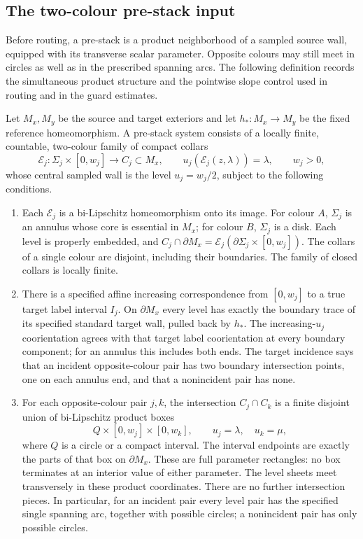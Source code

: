 \subsection{The two-colour pre-stack input}
\label{wl:prestack-subsection}

Before routing, a pre-stack is a product neighborhood of a sampled source
wall, equipped with its transverse scalar parameter.  Opposite colours may
still meet in circles as well as in the prescribed spanning arcs.  The
following definition records the simultaneous product structure and the
pointwise slope control used in routing and in the guard estimates.

\begin{definition}\label{wl:prestack}
Let $M_x,M_y$ be the source and target exteriors and let
$h_*:M_x\to M_y$ be the fixed reference homeomorphism.  A pre-stack
system consists of a locally finite, countable, two-colour family of
compact collars
\[
 \mathcal E_j:\Sigma_j\times[0,w_j]\longrightarrow C_j\subset M_x,
 \qquad u_j(\mathcal E_j(z,\lambda))=\lambda,\qquad w_j>0,
\]
whose central sampled wall is the level $u_j=w_j/2$, subject to the
following conditions.
\begin{enumerate}
\item Each $\mathcal E_j$ is a bi-Lipschitz homeomorphism onto its image.
For colour $A$, $\Sigma_j$ is an annulus whose core is essential in
$M_x$; for colour $B$, $\Sigma_j$ is a disk.
Each level is properly embedded, and
$C_j\cap\partial M_x=\mathcal E_j(\partial\Sigma_j\times[0,w_j])$.
The collars of a single colour are disjoint, including their boundaries.
The family of closed collars is locally finite.

\item There is a specified affine increasing correspondence from
$[0,w_j]$ to a true target label interval $I_j$.
On $\partial M_x$ every level has exactly the boundary trace of its
specified standard target wall, pulled back by $h_*$.
The increasing-$u_j$ coorientation agrees with that target label
coorientation at every boundary component; for an annulus this includes
both ends.  The target incidence says that an incident opposite-colour
pair has two boundary intersection points, one on each annulus end,
and that a nonincident pair has none.

\item For each opposite-colour pair $j,k$, the intersection
$C_j\cap C_k$ is a finite disjoint union of bi-Lipschitz product boxes
\[
 Q\times[0,w_j]\times[0,w_k],
 \qquad u_j=\lambda,\quad u_k=\mu,
\]
where $Q$ is a circle or a compact interval.  The interval endpoints
are exactly the parts of that box on $\partial M_x$.
These are full parameter rectangles: no box terminates at an interior
value of either parameter.  The level sheets meet transversely in
these product coordinates.  There are no further intersection pieces.
In particular, for an incident pair every level pair has the specified
single spanning arc, together with possible circles; a nonincident pair
has only possible circles.


\end{enumerate}
\end{definition}
